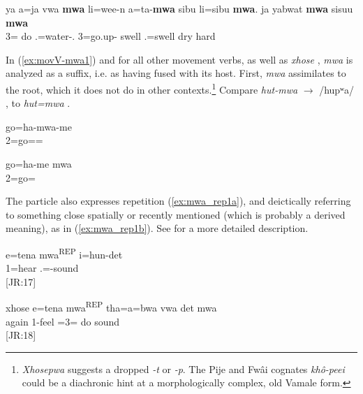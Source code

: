 \ea\label{ex:mwa_now1a}
\gll ya a=ja vwa \textbf{mwa} li=wee-n a=ta-\textbf{mwa} sibu li=sibu \textbf{mwa}. ja yabwat \textbf{mwa} sisuu \textbf{mwa}\\
  3= do  .=water-. 3=go.up- swell .=swell   dry  hard \\
\glt {}
\z

In (\ref{ex:movV-mwa1}) and for all other movement verbs, as well as \textit{xhose} , \textit{mwa} is analyzed as a suffix, i.e. as having fused with its host. First, \textit{mwa} assimilates to the root, which it does not do in other contexts.\footnote{\textit{Xhosepwa} suggests a dropped \textit{-t} or \textit{-p}. The Pije and Fwâi cognates \textit{khô-peei}  \parencite[155]{haudricourt_dictionnaire_1982} could be a diachronic hint at a morphologically complex, old Vamale form.} Compare \textit{hut-mwa} $\rightarrow$ /hupʷa/ , to \textit{hut=mwa} .

\ea \label{ex:movV-mwa1}
\gll go=ha-mwa-me\\
 2=go==\\
\glt {}
\z


\ea
\gll go=ha-me mwa\\
 2=go= \\
\glt {}
\z

The particle also expresses repetition (\ref{ex:mwa_rep1a}), and deictically referring to something close spatially or recently mentioned (which is probably a derived meaning), as in (\ref{ex:mwa_rep1b}). See  for a more detailed description. %


\ea\label{ex:mwa_rep1a}    
\gll e=tena mwa\textsuperscript{{\upshape REP}} i=hun-det\\
 1=hear  .=-sound\\
\glt {} {[JR:17]}
\z

\ea\label{ex:mwa_rep1b}
\gll xhose e=tena mwa\textsuperscript{{\upshape REP}} tha=a=bwa vwa det mwa\textsuperscript{{\upshape{}}}\\
 again 1-feel  =3= do sound \\
\glt {} {[JR:18]}
\z 


